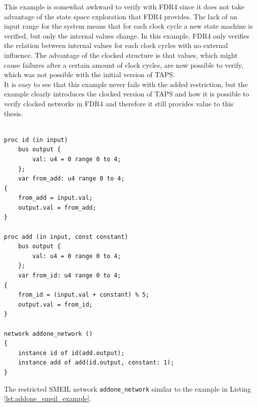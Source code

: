 This example is somewhat awkward to verify with FDR4 since it does not take advantage of the state space exploration that FDR4 provides. The lack of an input range for the system means that for each clock cycle a new state machine is verified, but only the internal values change. In this example, FDR4 only verifies the relation between internal values for each clock cycles with no external influence. The advantage of the clocked structure is that values, which might cause failures after a certain amount of clock cycles, are now possible to verify, which was not possible with the initial version of TAPS. \\

It is easy to see that this example never fails with the added restriction, but the example clearly introduces the clocked version of TAPS and how it is possible to verify clocked networks in FDR4 and therefore it still provides value to this thesis.

\begin{listing}
\begin{verbatim}

proc id (in input)
    bus output {
        val: u4 = 0 range 0 to 4;
    };
    var from_add: u4 range 0 to 4;
{
    from_add = input.val;
    output.val = from_add;
}

proc add (in input, const constant)
    bus output {
        val: u4 = 0 range 0 to 4;
    };
    var from_id: u4 range 0 to 4;
{
    from_id = (input.val + constant) % 5;
    output.val = from_id;
}

network addone_network ()
{
    instance id of id(add.output);
    instance add of add(id.output, constant: 1);
}
\end{verbatim}
\caption{The restricted SMEIL network \texttt{addone\_network} similar to the example in Listing \ref{lst:addone_smeil_example}.}
\label{lst:addone_mod_example}
\end{listing}

